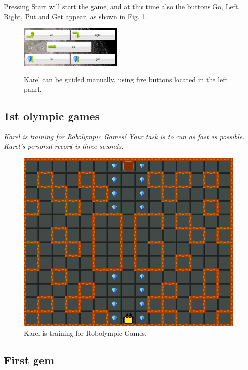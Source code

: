 \noindent
Pressing Start will start the game, and at this time also the buttons 
Go, Left, Right, Put and Get appear, as shown in Fig. \ref{fig:buttons2222}.\\[-7mm]

\begin{figure}[!ht]
\begin{center}
\includegraphics[width=5cm]{img/buttons-all.png}
\vspace{-0mm}
\caption{Karel can be guided manually, using five buttons located in the left panel.}
\vspace{-1.2cm}
\label{fig:buttons2222}
\end{center}
\end{figure}


\newpage
\subsection{1st olympic games}

{\em Karel is training for Robolympic Games! Your task is to run as fast as possible. Karel's personal record is three seconds.}

\begin{figure}[!ht]
\begin{center}
\includegraphics[height=0.4\textwidth]{img/a02.png}
\end{center}
\vspace{-4mm}
\caption{Karel is training for Robolympic Games.}
\label{fig:a02}
\vspace{-4mm}
\end{figure}
\noindent

\subsection{First gem}

